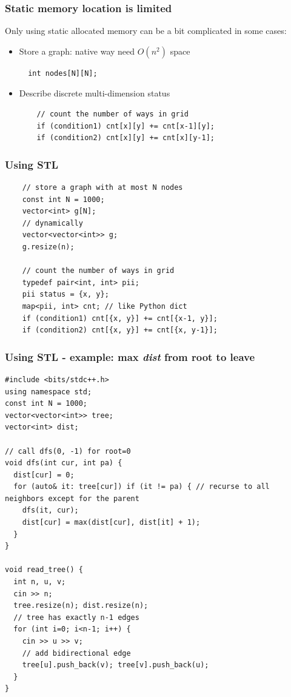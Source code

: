 \documentclass{beamer}
\begin{document}
\begin{frame}[fragile]
  \frametitle{Static memory location is limited}
Only using static allocated memory can be a bit complicated in some cases:
\begin{itemize}
  \item Store a graph: native way need $O(n^2)$ space
  \begin{verbatim}
  int nodes[N][N];
  \end{verbatim}
  \item Describe discrete multi-dimension status
  \begin{verbatim}
    // count the number of ways in grid
    if (condition1) cnt[x][y] += cnt[x-1][y];
    if (condition2) cnt[x][y] += cnt[x][y-1];
  \end{verbatim}
\end{itemize}
\end{frame}

\begin{frame}[fragile]
  \frametitle{Using STL}
  \begin{verbatim}
    // store a graph with at most N nodes
    const int N = 1000;
    vector<int> g[N];
    // dynamically
    vector<vector<int>> g;
    g.resize(n);

    // count the number of ways in grid
    typedef pair<int, int> pii;
    pii status = {x, y};
    map<pii, int> cnt; // like Python dict
    if (condition1) cnt[{x, y}] += cnt[{x-1, y}];
    if (condition2) cnt[{x, y}] += cnt[{x, y-1}];
  \end{verbatim}
\end{frame}

\begin{frame}[fragile]
  \frametitle{Using STL - example: max \textit{dist} from root to leave}
\begin{verbatim}
#include <bits/stdc++.h>
using namespace std;
const int N = 1000;
vector<vector<int>> tree;
vector<int> dist;

// call dfs(0, -1) for root=0
void dfs(int cur, int pa) {
  dist[cur] = 0;
  for (auto& it: tree[cur]) if (it != pa) { // recurse to all neighbors except for the parent
    dfs(it, cur);
    dist[cur] = max(dist[cur], dist[it] + 1);
  }
}

void read_tree() {
  int n, u, v;
  cin >> n;
  tree.resize(n); dist.resize(n);
  // tree has exactly n-1 edges
  for (int i=0; i<n-1; i++) {
    cin >> u >> v; 
    // add bidirectional edge
    tree[u].push_back(v); tree[v].push_back(u);
  }
}
\end{verbatim}
\end{frame}

\end{document}
